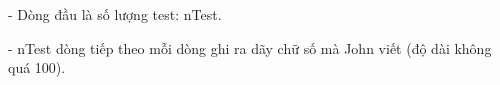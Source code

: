 - Dòng đầu là số lượng test: nTest.


- nTest dòng tiếp theo mỗi dòng ghi ra dãy chữ số mà John viết (độ dài không quá 100).